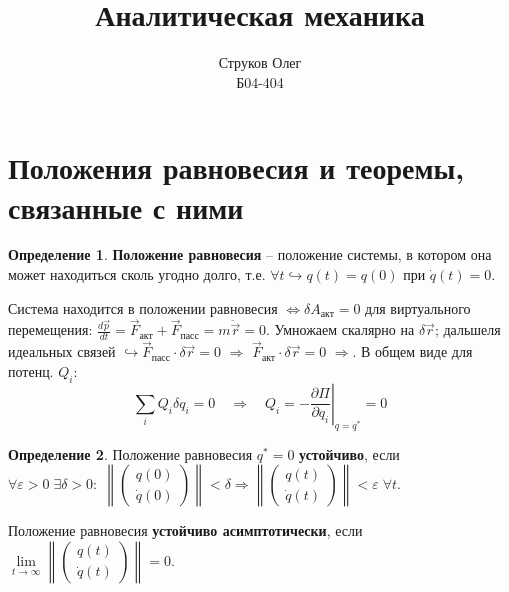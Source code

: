 \documentclass[12pt, a4paper]{article}
\theoremstyle{plain}
\theoremstyle{definition}
\newtheorem{definition}{Определение}[section]
\theoremstyle{remark}
\begin{document}
\title{\textbf{Аналитическая механика}}
\author{Струков Олег \\ \small Б04-404}
\date{}
\maketitle

\tableofcontents
\newpage

\section{Положения равновесия и теоремы, связанные с ними}

\begin{definition}
    \textbf{Положение равновесия} -- положение системы, в котором она может находиться сколь угодно долго, т.е. $\forall t \hookrightarrow  q(t) = q(0)$ при $\dot{q}(t) = 0  $.
\end{definition}


Система находится в положении равновесия $\Leftrightarrow \delta A_{\text{акт}} = 0$ для виртуального перемещения:
$\displaystyle \frac{d\vec{p}}{dt} = \vec{F}_{\text{акт}} + \vec{F}_{\text{пасс}} = m\ddot{\vec{r}} = 0$. Умножаем скалярно на $\delta \vec{r}$; дальшеля идеальных связей $\hookrightarrow \vec{F}_{\text{пасс}} \cdot \delta\vec{r} = 0$ $\Rightarrow$ $\vec{F}_{\text{акт}} \cdot \delta\vec{r} = 0$ $\Rightarrow$. В общем виде для потенц. $Q_i$:
$$\sum_i Q_i \delta q_i = 0 \quad \Rightarrow \quad Q_i = - \left.\frac{\partial \Pi}{\partial q_i}\right|_{q=q^*} = 0$$


\begin{definition}
    Положение равновесия $q^* = 0$ \textbf{устойчиво}, если $\forall \varepsilon > 0 \; \exists \delta > 0: \; \left\| \begin{pmatrix} q(0) \\ \dot{q}(0) \end{pmatrix} \right\| < \delta \Rightarrow \left\| \begin{pmatrix} q(t) \\ \dot{q}(t) \end{pmatrix} \right\| < \varepsilon \; \forall t$.

    Положение равновесия \textbf{устойчиво асимптотически}, если $\lim\limits_{t \to \infty} \left\| \begin{pmatrix} q(t) \\ \dot{q}(t) \end{pmatrix} \right\| = 0$.
\end{definition}
\end{document}
